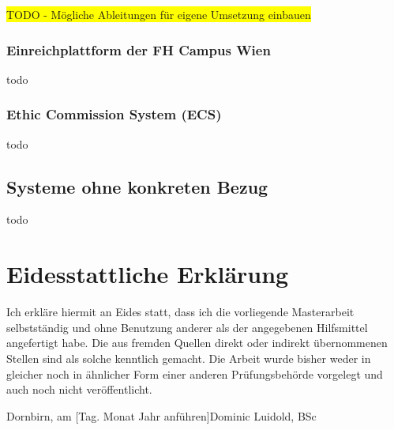 \colorbox{yellow}{TODO - Mögliche Ableitungen für eigene Umsetzung einbauen}

\subsection{Einreichplattform der FH Campus Wien}
\label{sub-sec:einreichplattform-fh-campus-wien}

todo

\subsection{Ethic Commission System (ECS)}
\label{sub-sec:ecs}

todo

\section{Systeme ohne konkreten Bezug}
\label{sec:systeme-ohne-bezug}

todo

\clearpage
{}
{}
\printbibliography

\clearpage
\chapter*{Eidesstattliche Erklärung}
Ich erkläre hiermit an Eides statt, dass ich die vorliegende Masterarbeit selbstständig und ohne Benutzung anderer als der angegebenen Hilfsmittel angefertigt habe. Die aus fremden Quellen direkt oder indirekt übernommenen Stellen sind als solche kenntlich gemacht. Die Arbeit wurde bisher weder in gleicher noch in ähnlicher Form einer anderen Prüfungsbehörde vorgelegt und auch noch nicht veröffentlicht.

\vspace{5cm}
\noindent
Dornbirn, am [Tag. Monat Jahr anführen]\hfill Dominic Luidold, BSc


